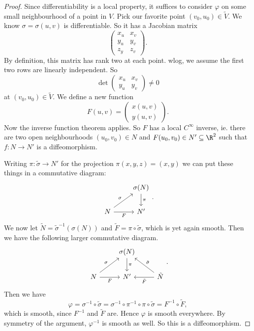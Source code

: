 \documentclass[a4paper]{article}
\begin{document}
\begin{proof}
  Since differentiability is a local property, it suffices to consider $\varphi$ on some small neighbourhood of a point in $V$. Pick our favorite point $(v_0, u_0) \in \tilde{V}$. We know $\sigma = \sigma(u, v)$ is differentiable. So it has a Jacobian matrix
  \[
    \begin{pmatrix}
      x_u & x_v\\
      y_u & y_v\\
      z_y & z_v
    \end{pmatrix}.
  \]
  By definition, this matrix has rank two at each point. wlog, we assume the first two rows are linearly independent. So
  \[
    \det
    \begin{pmatrix}
      x_u & x_v\\
      y_u & y_v
    \end{pmatrix} \not= 0
  \]
  at $(v_0, u_0) \in \tilde{V}$. We define a new function
  \[
    F(u, v) =
    \begin{pmatrix}
      x(u, v)\\
      y(u, v)
    \end{pmatrix}.
  \]
  Now the inverse function theorem applies. So $F$ has a local $C^\infty$ inverse, ie. there are two open neighbourhoods $(u_0, v_0) \in N$ and $F(u_0, v_0) \in N' \subseteq \R^2$ such that $f: N \to N'$ is a diffeomorphism.

  Writing $\pi: \tilde{\sigma} \to N'$ for the projection $\pi(x, y, z) = (x, y)$ we can put these things in a commutative diagram:
  \[
    \begin{tikzcd}
      & \sigma(N) \ar[d, "\pi"]\\
      N \ar[r, "F"'] \ar[ru, "\sigma"] & N'
    \end{tikzcd}.
  \]
  We now let $\tilde{N} = \tilde{\sigma}^{-1}(\sigma(N))$ and $\tilde{F} = \pi \circ \tilde{\sigma}$, which is yet again smooth. Then we have the following larger commutative diagram.
  \[
    \begin{tikzcd}
      & \sigma(N) \ar[d, "\pi"]\\
      N \ar[r, "F"'] \ar[ru, "\sigma"] & N' & \tilde{N} \ar[l, "\tilde{F}"] \ar[lu, "\tilde{\sigma}"']
    \end{tikzcd}.
  \]
  Then we have
  \[
    \varphi = \sigma^{-1} \circ \tilde{\sigma} = \sigma^{-1} \circ \pi^{-1} \circ \pi \circ \tilde{\sigma} = F^{-1} \circ \tilde{F},
  \]
  which is smooth, since $F^{-1}$ and $\tilde{F}$ are. Hence $\varphi$ is smooth everywhere. By symmetry of the argument, $\varphi^{-1}$ is smooth as well. So this is a diffeomorphism.
\end{proof}
\end{document}
